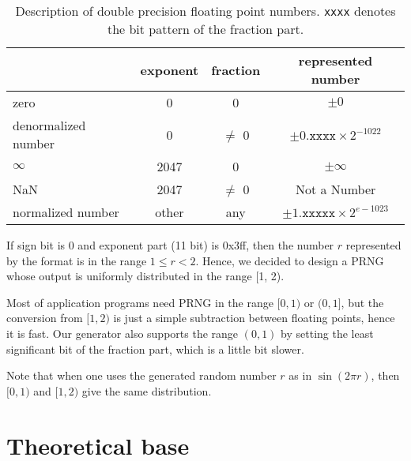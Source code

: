 \documentclass{svmult}
\begin{document}
\begin{table}[h]
  \begin{center}
    \begin{tabular}{|l|c|c|c|} \hline
      & exponent & fraction & represented number \\ \hline
      zero & 0 & 0 & $\pm 0$ \\ \hline
      denormalized number & 0 & $\neq$ 0 
      & $\pm 0.\texttt{xxxx} \times 2^{-1022}$ \\ 
      \hline
      $\infty$ & 2047 & 0 & $\pm\infty$ \\ \hline
      NaN & 2047 & $\neq$ 0 & Not a Number \\ \hline
      normalized number & 
      other & any & 
      $\pm 1.\texttt{xxxxx} \times 2^{e - 1023}$ \\ \hline
    \end{tabular}
    \caption{Description of double precision floating point
      numbers. \texttt{xxxx} denotes the bit pattern of the fraction part.}
    \label{tab:ieee}
  \end{center}
\end{table}

If sign bit is 0 and exponent part (11 bit) is 0x3ff,
then the number $r$ represented by the format is in the range $1 \le r
< 2$. Hence, we decided to design a PRNG whose output is uniformly
distributed in the range [1, 2).

Most of application programs need PRNG in the range $[0,1)$
or $(0,1]$, but the conversion from $[1,2)$ is just a simple
subtraction between floating points, hence
it is fast. Our generator also supports the range $(0,1)$
by setting the least significant bit of the
fraction part, which is a little bit slower.

Note that when one uses the generated random number $r$
as in $\sin(2 \pi r)$, then $[0,1)$ and $[1,2)$ give the same distribution.

\section{Theoretical base}
\label{sec:base}
\end{document}
